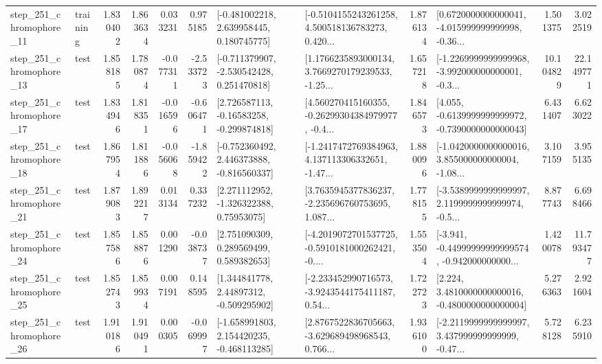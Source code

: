\begin{tabular}{llrrrrllrlrr}
  step\_251\_chromophore\_11 &  training &      1.830402 &    1.863634 &      0.033231 &  0.975185 &    [-0.481002218, 2.639958445, 0.180745775] &  [-0.5104155243261258, 4.500518136783273, 0.420... &       1.876134 &  [0.6720000000000041, -4.015999999999998, -0.36... &            1.501375 &          3.022519 \\
  step\_251\_chromophore\_13 &      test &      1.858185 &    1.780874 &     -0.077311 & -2.533723 &   [-0.711379907, -2.530542428, 0.251470818] &  [1.1766235893000134, 3.7669270179239533, -1.25... &       1.657218 &  [-1.2269999999999968, -3.992000000000001, -0.3... &           10.104829 &         22.149771 \\
  step\_251\_chromophore\_17 &      test &      1.834946 &    1.818351 &     -0.016596 & -0.606471 &    [2.726587113, -0.16583258, -0.299874818] &  [4.560270415160355, -0.26299304384979977, -0.4... &       1.846573 &  [4.055, -0.6139999999999972, -0.7390000000000043] &            6.431407 &          6.623022 \\
  step\_251\_chromophore\_18 &      test &      1.867954 &    1.811886 &     -0.056068 & -1.859422 &   [-0.752360492, 2.446373888, -0.816560337] &  [-1.2417472769384963, 4.137113306332651, -1.47... &       1.880096 &  [-1.0420000000000016, 3.855000000000004, -1.08... &            3.107159 &          3.955135 \\
  step\_251\_chromophore\_21 &      test &      1.879083 &    1.892217 &      0.013134 &  0.337232 &     [2.271112952, -1.326322388, 0.75953075] &  [3.7635945377836237, -2.235696760753695, 1.087... &       1.778155 &  [-3.5389999999999997, 2.1199999999999974, -0.5... &            8.877743 &          6.698466 \\
  step\_251\_chromophore\_24 &      test &      1.857586 &    1.858876 &      0.001290 & -0.038737 &     [2.751090309, 0.289569499, 0.589382653] &  [-4.2019072701537725, -0.5910181000262421, -0.... &       1.553504 &  [-3.941, -0.44999999999999574, -0.942000000000... &            1.420078 &         11.793477 \\
  step\_251\_chromophore\_25 &      test &      1.852743 &    1.859934 &      0.007191 &  0.148595 &     [1.344841778, 2.44897312, -0.509295902] &  [-2.233452990716573, -3.9243544175411187, 0.54... &       1.722723 &   [2.224, 3.4810000000000016, -0.4800000000000004] &            5.276363 &          2.921604 \\
  step\_251\_chromophore\_26 &      test &      1.910186 &    1.910491 &      0.000305 & -0.069997 &   [-1.658991803, 2.154420235, -0.468113285] &  [2.8767522836705663, -3.629689498968543, 0.766... &       1.936100 &  [-2.2119999999999997, 3.437999999999999, -0.47... &            5.728128 &          6.235910 \\

\end{tabular}
